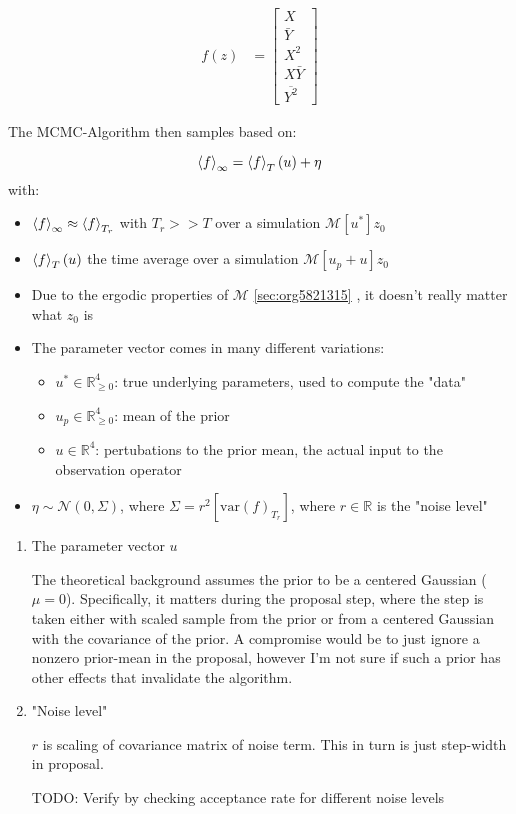 \documentclass[11pt]{article}
\newcommand{\R}{{\mathbb{R}}}
\newcommand{\N}[2]{\mathcal{N}\left(#1,#2\right)}
\begin{document}
\begin{align}
  f(z) &=
  \begin{bmatrix}
    X \\
    \bar{Y} \\
    X^2 \\
    X \bar{Y} \\
    \overline{Y^2}
  \end{bmatrix}
\end{align}

The MCMC-Algorithm then samples based on:

$$\expval{f}_\infty = \expval{f}_T(u) + \eta$$
with:
\begin{itemize}
\item \(\expval{f}_\infty \approx \expval{f}_{T_r}\) with \(T_r >> T\) over a simulation \(\mathcal{M}[u^*] z_0\)
\item \(\expval{f}_T(u)\) the time average over a simulation \(\mathcal{M}[u_p + u] z_0\)
\item Due to the ergodic properties of \(\mathcal{M}\) \ref{sec:org5821315} , it doesn't really matter what \(z_0\) is
\item The parameter vector comes in many different variations:
\begin{itemize}
\item \(u^* \in \R^4_{\geq 0}\): true underlying parameters, used to compute the "data"
\item \(u_p \in \R^4_{\geq 0}\): mean of the prior
\item \(u \in \R^4\): pertubations to the prior mean, the actual input to the observation operator
\end{itemize}
\item \(\eta \sim \N{0}{\Sigma}\), where \(\Sigma = r^2 [\text{var}(f)_{T_r}]\),
where \(r \in \R\) is the "noise level"
\end{itemize}

\begin{enumerate}
\item The parameter vector \(u\)
\label{sec:org13c278e}

The theoretical background assumes the prior to be a centered Gaussian (\(\mu = 0\)).
Specifically, it matters during the proposal step, where the step is taken either with
scaled sample from the prior or from a centered Gaussian with the covariance of the prior.
A compromise would be to just ignore a nonzero prior-mean in the proposal, however I'm not
sure if such a prior has other effects that invalidate the algorithm.

\item "Noise level"
\label{sec:org3bc14a9}

\(r\) is scaling of covariance matrix of noise term. This in turn is just step-width in proposal.

TODO: Verify by checking acceptance rate for different noise levels
\end{enumerate}
\end{document}
